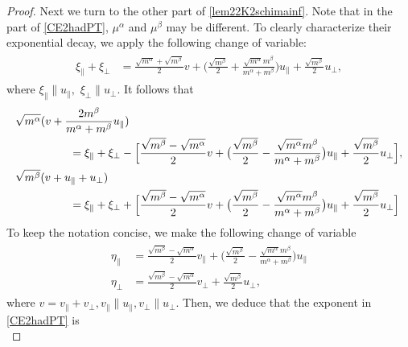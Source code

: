 \documentclass[reqno]{amsart}
\numberwithin{equation}{section}
\numberwithin{equation}{section}
\begin{document}
\begin{proof}
		Next we turn to the other part of \eqref{lem22K2schimainf}. Note that in the part of \eqref{CE2hadPT}, $\mu^{\alpha}$ and $\mu^{\beta}$ may be different. To clearly characterize their exponential decay, we apply the following change of variable:
		\begin{eqnarray}\label{lem2and222cgv}
			\begin{split}
				\xi_{\parallel} + \xi_{\perp} &= \frac{\sqrt{m^\alpha}+\sqrt{m^\beta}}{2}v + \big(\frac{\sqrt{m^\beta}}{2}+\frac{\sqrt{m^{\alpha}}m^{\beta}}{m^{\alpha}+m^{\beta}}\big)u_{\parallel}+\frac{\sqrt{m^\beta}}{2}u_{\perp}, 
			\end{split}
		\end{eqnarray}
		where $\xi_{\parallel} \parallel u_{\parallel},\,\, \xi_{\perp} \parallel u_{\perp}$. It follows that
		\begin{align*}
			&\sqrt{m^\alpha}(v + \frac{2m^{\beta}}{m^{\alpha}+m^{\beta}}u_{\parallel})\\
			&\hspace{1.7cm}= \xi_{\parallel} + \xi_{\perp}-\Big[\frac{\sqrt{m^\beta}-\sqrt{m^\alpha}}{2}v+\big(\frac{\sqrt{m^\beta}}{2}-\frac{\sqrt{m^{\alpha}}m^{\beta}}{m^{\alpha}+m^{\beta}}\big)u_{\parallel}+\frac{\sqrt{m^\beta}}{2}u_{\perp}\Big], \\
			&\sqrt{m^\beta}(v +u_{\parallel}+ u_{\perp}) \\
			&\hspace{1.7cm}= \xi_{\parallel} + \xi_{\perp}+\Big[\frac{\sqrt{m^\beta}-\sqrt{m^\alpha}}{2}v+\big(\frac{\sqrt{m^\beta}}{2}-\frac{\sqrt{m^{\alpha}}m^{\beta}}{m^{\alpha}+m^{\beta}}\big)u_{\parallel}+\frac{\sqrt{m^\beta}}{2}u_{\perp}\Big]
		\end{align*}
		To keep the notation concise, we make the following change of variable
		\begin{eqnarray}\label{lem2223cgvb3}
			\begin{split}
				\eta_{\parallel} &= \frac{\sqrt{m^\beta}-\sqrt{m^\alpha}}{2}v_{\parallel} + \big(\frac{\sqrt{m^\beta}}{2}-\frac{\sqrt{m^{\alpha}}m^{\beta}}{m^{\alpha}+m^{\beta}}\big)u_{\parallel} \\
				\eta_{\perp} &= \frac{\sqrt{m^\beta}-\sqrt{m^\alpha}}{2}v_{\perp} +\frac{\sqrt{m^\beta}}{2}u_{\perp},
			\end{split}
		\end{eqnarray}
		where $v=v_{\parallel}+v_{\perp}, v_{\parallel} \parallel u_{\parallel}, v_{\perp}\parallel u_{\perp}$.
		Then, we deduce that the exponent in \eqref{CE2hadPT} is 
		\begin{equation*}

\end{equation*}
\end{proof}
\end{document}
